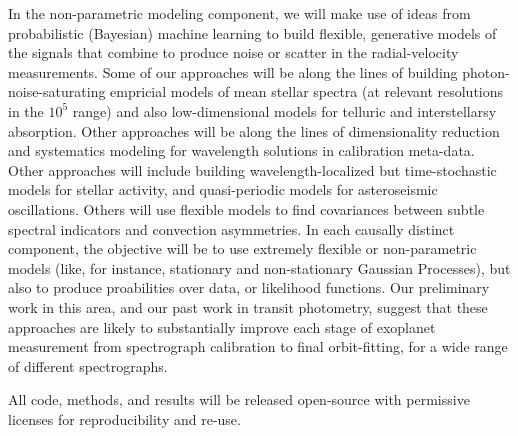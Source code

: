 \documentclass[12pt, fullpage, letterpaper]{article}
\begin{document}
In the non-parametric modeling component, we will make use of ideas
from probabilistic (Bayesian) machine learning to build flexible,
generative models of the signals that combine to produce noise or
scatter in the radial-velocity measurements. Some of our approaches
will be along the lines of building photon-noise-saturating empricial
models of mean stellar spectra (at relevant resolutions in the $10^5$
range) and also low-dimensional models for telluric and interstellarsy
absorption. Other approaches will be along the lines of dimensionality
reduction and systematics modeling for wavelength solutions in
calibration meta-data. Other approaches will include building
wavelength-localized but time-stochastic models for stellar activity,
and quasi-periodic models for asteroseismic oscillations. Others will
use flexible models to find covariances between subtle spectral
indicators and convection asymmetries. In each causally distinct
component, the objective will be to use extremely flexible or
non-parametric models (like, for instance, stationary and
non-stationary Gaussian Processes), but also to produce proabilities
over data, or likelihood functions.  Our preliminary work in this
area, and our past work in transit photometry, suggest that these
approaches are likely to substantially improve each stage of exoplanet
measurement from spectrograph calibration to final orbit-fitting, for
a wide range of different spectrographs.

All code, methods, and results will be released open-source with
permissive licenses for reproducibility and re-use.
\end{document}
